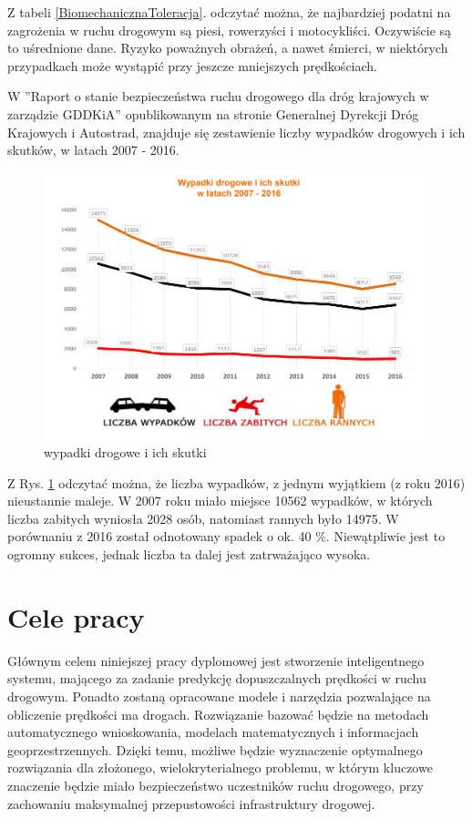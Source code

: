 Z tabeli \ref{BiomechanicznaToleracja}. odczytać można, że najbardziej podatni na zagrożenia w ruchu drogowym są piesi, rowerzyści i motocykliści. Oczywiście są to uśrednione dane. Ryzyko poważnych obrażeń, a nawet śmierci, w niektórych przypadkach może wystąpić przy jeszcze mniejszych prędkościach.

\newpage


W ''Raport o stanie bezpieczeństwa ruchu drogowego dla dróg krajowych w zarządzie GDDKiA'' opublikowanym na stronie Generalnej Dyrekcji Dróg Krajowych i Autostrad, znajduje się zestawienie liczby wypadków drogowych i ich skutków, w latach 2007 - 2016.

\begin{figure}[h]
\caption{wypadki drogowe i ich skutki}
\label{wypadkiSkutki}
\centering
\includegraphics[width=1\textwidth]{picture1}
\end{figure}

Z Rys. \ref{wypadkiSkutki} odczytać można, że liczba wypadków, z jednym wyjątkiem (z roku 2016) nieustannie maleje. W 2007 roku miało miejsce 10562 wypadków, w których liczba zabitych wyniosła 2028 osób, natomiast rannych było 14975. W porównaniu z 2016 został odnotowany spadek o ok. 40 \%. Niewątpliwie jest to ogromny sukces, jednak liczba ta dalej jest zatrważająco wysoka.

\newpage
\section{Cele pracy}
\label{sec:celePracy}

Głównym celem niniejszej pracy dyplomowej jest stworzenie inteligentnego systemu, mającego za zadanie predykcję dopuszczalnych prędkości w ruchu drogowym. Ponadto zostaną opracowane modele i narzędzia pozwalające na obliczenie prędkości ma drogach. Rozwiązanie bazować będzie na metodach automatycznego wnioskowania, modelach matematycznych i informacjach geoprzestrzennych. Dzięki temu, możliwe będzie wyznaczenie optymalnego rozwiązania dla złożonego, wielokryterialnego problemu, w którym kluczowe znaczenie będzie miało bezpieczeństwo uczestników ruchu drogowego, przy zachowaniu maksymalnej przepustowości infrastruktury drogowej.

